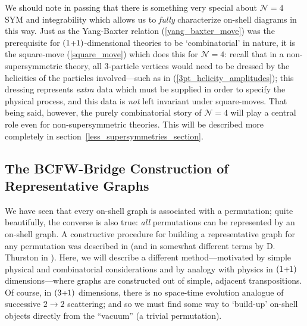 \documentclass[12pt,hyperref,compress]{JHEP3}
\newcommand{\pl}{\hspace{0.5pt}\text{{\small+}}\hspace{-0.5pt}}
\begin{document}
We should note in passing that there is something very special about $\mathcal{N}\!=\!4$ SYM and integrability which allows us to {\it fully} characterize on-shell diagrams in this way. Just as the Yang-Baxter relation (\ref{yang_baxter_move}) was the prerequisite for $(1\pl1)$-dimensional theories to be `combinatorial' in nature, it is the square-move (\ref{square_move}) which does this for $\mathcal{N}\!=\!4$: recall that in a non-supersymmetric theory, all $3$-particle vertices would need to be dressed by the helicities of the particles involved---such as in (\ref{3pt_helicity_amplitudes}); this dressing represents {\it extra} data which must be supplied in order to specify the physical process, and this data is {\it not} left invariant under square-moves. That being said, however, the purely combinatorial story of $\mathcal{N}\!=\!4$ will play a central role even for non-supersymmetric theories. This will be described more completely in \mbox{section \ref{less_supersymmetries_section}}.


\subsection{The BCFW-Bridge Construction of Representative Graphs}\label{BCFW_bridge_decomposition_subsection}
We have seen that every on-shell graph is associated with a permutation; quite beautifully, the converse is also true: {\it all} permutations can be represented by an on-shell graph. A constructive procedure for building a representative graph for any permutation was described in \cite{P} (and in somewhat different terms by D. Thurston in \cite{T}). Here, we will describe a different method---motivated by simple physical and combinatorial considerations and by analogy with physics in $(1\pl1)$ dimensions---where graphs are constructed out of simple, adjacent transpositions. Of course, in $(3\pl1)$ dimensions, there is no space-time evolution analogue of successive $2\!\to\!2$ scattering; and so we must find some way to `build-up' on-shell objects directly from the ``vacuum'' (a trivial permutation).
\end{document}

